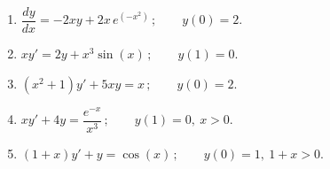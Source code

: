 \documentclass[10pt]{article}
\begin{document}
\begin{enumerate}[leftmargin=*, label=\numbox{\arabic*}, resume]

\item
    \begin{problem}[\vspace{5cm}]
        \(\dfrac{dy}{dx} = -2xy + 2x\,e^{(-x^2)}\,; \qquad y(0) = 2.\)
    \end{problem}

\item
    \begin{problem}[\vspace{5cm}]
        \(xy' = 2y + x^3 \sin(x)\,; \qquad y(1) = 0.\)
    \end{problem}

\item
    \begin{problem}[\vspace{5cm}]
        \((x^2 + 1)y' + 5xy = x\,; \qquad y(0) = 2.\)
    \end{problem}

\item
    \begin{problem}[\vspace{5cm}]
        \(xy' + 4y = \dfrac{e^{-x}}{x^3}\,; \qquad y(1) = 0,\ x > 0.\)
    \end{problem}

\item
    \begin{problem}[\vspace{5cm}]
        \((1 + x)y' + y = \cos(x)\,; \qquad y(0) = 1,\ 1 + x > 0.\)
    \end{problem}

\end{enumerate}
\end{document}
